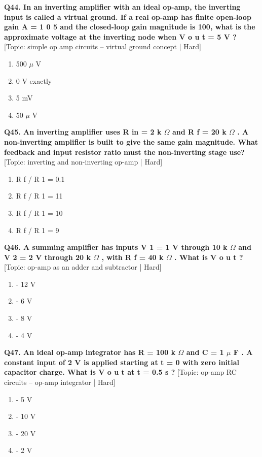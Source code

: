 \noindent\textbf{Q44. In an inverting amplifier with an ideal op-amp, the inverting input is called a virtual ground. If a real op-amp has finite open-loop gain A = 1 0 5 and the closed-loop gain magnitude is 100, what is the approximate voltage at the inverting node when V o u t = 5 V ?} \hfill [Topic: simple op amp circuits -- virtual ground concept | Hard]
\begin{enumerate}[label=(\alph*),topsep=2pt,itemsep=1pt,partopsep=0pt,parsep=0pt]
    \item {500 $\mu$ V}
    \item {0 V exactly}
    \item {5 mV}
    \item {50 $\mu$ V}
\end{enumerate}
\vspace{2mm}

\noindent\textbf{Q45. An inverting amplifier uses R in = 2 k $\Omega$ and R f = 20 k $\Omega$ . A non-inverting amplifier is built to give the same gain magnitude. What feedback and input resistor ratio must the non-inverting stage use?} \hfill [Topic: inverting and non-inverting op-amp | Hard]
\begin{enumerate}[label=(\alph*),topsep=2pt,itemsep=1pt,partopsep=0pt,parsep=0pt]
    \item {R f / R 1 = 0.1}
    \item {R f / R 1 = 11}
    \item {R f / R 1 = 10}
    \item {R f / R 1 = 9}
\end{enumerate}
\vspace{2mm}

\noindent\textbf{Q46. A summing amplifier has inputs V 1 = 1 V through 10 k $\Omega$ and V 2 = 2 V through 20 k $\Omega$ , with R f = 40 k $\Omega$ . What is V o u t ?} \hfill [Topic: op-amp as an adder and subtractor | Hard]
\begin{enumerate}[label=(\alph*),topsep=2pt,itemsep=1pt,partopsep=0pt,parsep=0pt]
    \item {- 12 V}
    \item {- 6 V}
    \item {- 8 V}
    \item {- 4 V}
\end{enumerate}
\vspace{2mm}

\noindent\textbf{Q47. An ideal op-amp integrator has R = 100 k $\Omega$ and C = 1 $\mu$ F . A constant input of 2 V is applied starting at t = 0 with zero initial capacitor charge. What is V o u t at t = 0.5 s ?} \hfill [Topic: op-amp RC circuits -- op-amp integrator | Hard]
\begin{enumerate}[label=(\alph*),topsep=2pt,itemsep=1pt,partopsep=0pt,parsep=0pt]
    \item {- 5 V}
    \item {- 10 V}
    \item {- 20 V}
    \item {- 2 V}
\end{enumerate}
\vspace{2mm}

